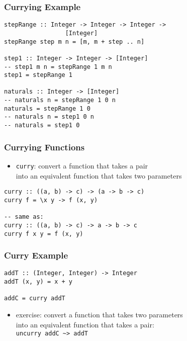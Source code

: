 \documentclass[dvipsnames]{beamer}
\theoremstyle{plain}
\begin{document}
\begin{frame}[fragile]
  \frametitle{Currying Example}

  \begin{lstlisting}
stepRange :: Integer -> Integer -> Integer ->
                 [Integer]
stepRange step m n = [m, m + step .. n]

step1 :: Integer -> Integer -> [Integer]
-- step1 m n = stepRange 1 m n
step1 = stepRange 1

naturals :: Integer -> [Integer]
-- naturals n = stepRange 1 0 n
naturals = stepRange 1 0
-- naturals n = step1 0 n
-- naturals = step1 0
  \end{lstlisting}
\end{frame}

\begin{frame}[fragile]
  \frametitle{Currying Functions}

  \begin{itemize}
    \item \lstinline|curry|: convert a function that takes a pair\\
      into an equivalent function that takes two parameters
  \end{itemize}

  \begin{lstlisting}[deletekeywords={curry}]
curry :: ((a, b) -> c) -> (a -> b -> c)
curry f = \x y -> f (x, y)

-- same as:
curry :: ((a, b) -> c) -> a -> b -> c
curry f x y = f (x, y)
  \end{lstlisting}
\end{frame}

\begin{frame}[fragile]
  \frametitle{Curry Example}

  \begin{lstlisting}
addT :: (Integer, Integer) -> Integer
addT (x, y) = x + y

addC = curry addT
  \end{lstlisting}

  \pause
  \begin{itemize}
    \item exercise: convert a function that takes two parameters\\
      into an equivalent function that takes a pair:\\
      \lstinline|uncurry addC ~> addT|
  \end{itemize}
\end{frame}
\end{document}
